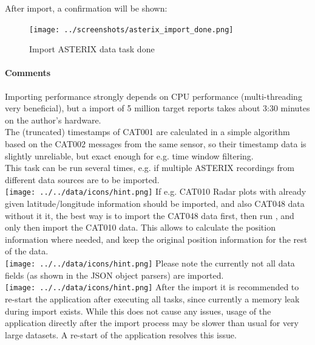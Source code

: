 After import, a confirmation will be shown:

\begin{figure}[H]
  \center
    \texttt{[image: ../screenshots/asterix\_import\_done.png]}
  \caption{Import ASTERIX data task done}
\end{figure}

\paragraph{Comments}
Importing performance strongly depends on CPU performance (multi-threading very beneficial), but a import of 5 million target reports takes about 3:30 minutes on the author's hardware. \\

The (truncated) timestamps of CAT001 are calculated in a simple algorithm based on the CAT002 messages from the same sensor, so their timestamp data is slightly unreliable, but exact enough for e.g. time window filtering. \\

This task can be run several times, e.g. if multiple ASTERIX recordings from different data sources are to be imported. \\

\texttt{[image: ../../data/icons/hint.png]} If e.g. CAT010 Radar plots with already given latitude/longitude information should be imported, and also CAT048 data without it it, the best way is to import the CAT048 data first, then run , and only then import the CAT010 data. This allows to calculate the position information where needed, and keep the original position information for the rest of the data. \\

\texttt{[image: ../../data/icons/hint.png]} Please note the currently not all data fields (as shown in the JSON object parsers) are imported.\\

\texttt{[image: ../../data/icons/hint.png]} After the import it is recommended to re-start the application after executing all tasks, since currently a memory leak during import exists. While this does not cause any issues, usage of the application directly after the import process may be slower than usual for very large datasets. A re-start of the application resolves this issue. \\ 


